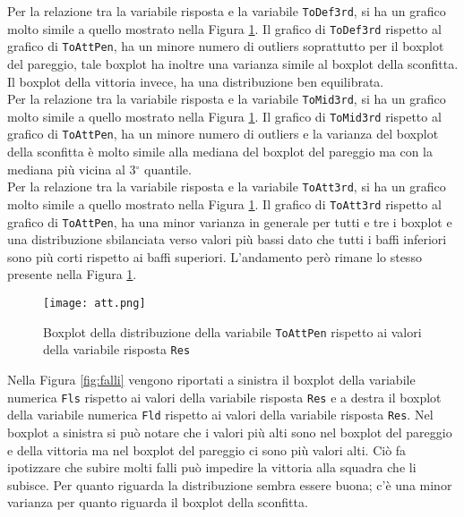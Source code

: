Per la relazione tra la variabile risposta e la variabile \texttt{ToDef3rd}, si ha un grafico molto simile a quello mostrato nella Figura \ref{fig:att}. Il grafico di \texttt{ToDef3rd} rispetto al grafico di \texttt{ToAttPen}, ha un minore numero di outliers soprattutto per il boxplot del pareggio, tale boxplot ha inoltre una varianza simile al boxplot della sconfitta. Il boxplot della vittoria invece, ha una distribuzione ben equilibrata.\\

Per la relazione tra la variabile risposta e la variabile \texttt{ToMid3rd}, si ha un grafico molto simile a quello mostrato nella Figura \ref{fig:att}. Il grafico di \texttt{ToMid3rd} rispetto al grafico di \texttt{ToAttPen}, ha un minore numero di outliers e la varianza del boxplot della sconfitta è molto simile alla mediana del boxplot del pareggio ma con la mediana più vicina al 3$^{\circ}$ quantile.\\

Per la relazione tra la variabile risposta e la variabile \texttt{ToAtt3rd}, si ha un grafico molto simile a quello mostrato nella Figura \ref{fig:att}. Il grafico di \texttt{ToAtt3rd} rispetto al grafico di \texttt{ToAttPen}, ha una minor varianza in generale per tutti e tre i boxplot e una distribuzione sbilanciata verso valori più bassi dato che tutti i baffi inferiori sono più corti rispetto ai baffi superiori. L'andamento però rimane lo stesso presente nella Figura \ref{fig:att}.\\

\begin{figure}[htbp]
	\begin{center}
		\texttt{[image: att.png]}
		\caption{Boxplot della distribuzione della variabile \texttt{ToAttPen} rispetto ai valori della variabile risposta \texttt{Res} } \label{fig:att}
	\end{center}
\end{figure}

Nella Figura \ref{fig:falli} vengono riportati a sinistra il boxplot della variabile numerica \texttt{Fls} rispetto ai valori della variabile risposta \texttt{Res} e a destra il boxplot della variabile numerica \texttt{Fld} rispetto ai valori della variabile risposta \texttt{Res}. Nel boxplot a sinistra si può notare che i valori più alti sono nel boxplot del pareggio e della vittoria ma nel boxplot del pareggio ci sono più valori alti. Ciò fa ipotizzare che subire molti falli può impedire la vittoria alla squadra che li subisce. Per quanto riguarda la distribuzione sembra essere buona; c'è una minor varianza per quanto riguarda il boxplot della sconfitta. \\

